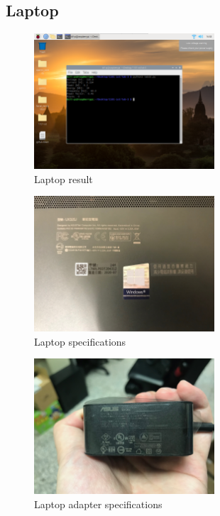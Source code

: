 \documentclass[12pt, a4paper, onside]{article}
\begin{document}
\subsection{Laptop}
\begin{figure}[h]
  \centering
  \includegraphics[width=0.6\textwidth]{img/9_res_laptop}
  \caption{Laptop result}
\end{figure}
\begin{figure}[h]
  \centering
  \includegraphics[width=0.6\textwidth]{img/9_spe_laptop}
  \caption{Laptop specifications}
\end{figure}
\begin{figure}[h]
  \centering
  \includegraphics[width=0.6\textwidth]{img/9_spe_laptop_adapter}
  \caption{Laptop adapter specifications}
\end{figure}
\end{document}
